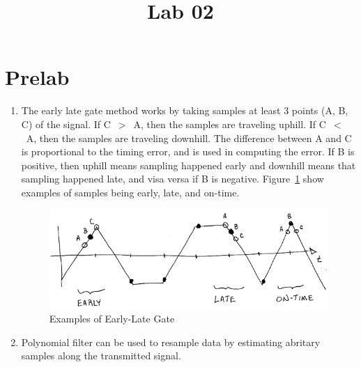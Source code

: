 \documentclass{article}
\begin{document}
\title{Lab 02}

\section{Prelab}
\label{sec:prelab}

\begin{enumerate}
\item
The early late gate method works by taking samples at least 3 points (A, B, C) of the signal.
If C~$>$~A, then the samples are traveling uphill. If C~$<$~A, then the samples are traveling downhill.
The difference between A and C is proportional to the timing error, and is used in computing
the error. If B is positive, then uphill means sampling happened early and downhill means that
sampling happened late, and visa versa if B is negative. Figure~\ref{fig:earlylate} show examples
of samples being early, late, and on-time.

\begin{figure}[hb]
\centering
\includegraphics{LateEarlyGate.png}
\caption{Examples of Early-Late Gate}
\label{fig:earlylate}
\end{figure}

\item
Polynomial filter can be used to resample data by estimating abritary samples along the transmitted signal.

\end{enumerate}
\end{document}
